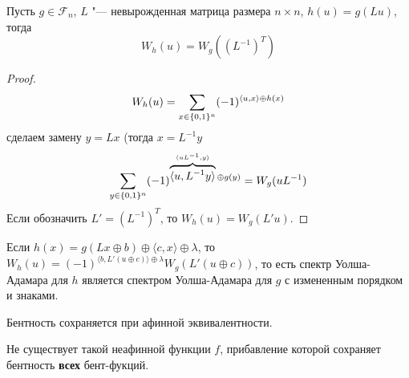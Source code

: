 \begin{remark}
Пусть $g \in \mathscr{F}_n$, $L$ "--- невырожденная матрица размера $n \times n$,
$h(u) = g(Lu)$, тогда $$W_h(u) = W_g((L^{-1})^{T})$$
\end{remark}

\begin{proof}
\[
W_h(u) = \sum\limits_{x \in \{0,1\}^n} (-1)^{\langle u,x \rangle \oplus h(x)}
\] 
сделаем замену $y = Lx$ (тогда $x = L^{-1} y$
\[
\sum\limits_{y \in \{0,1\}^n} (-1)^{\overbrace{\langle u, L^{-1} y \rangle}^
                                 {\langle u L^{-1}, y \rangle} \oplus g(y)} =
                                 W_g(u L^{-1})
\]
Если обозначить $L' = (L^{-1})^{T}$, то $W_h(u) = W_g(L'u)$.
\end{proof}

\begin{corollary}
Если $h(x) = g(Lx \oplus b) \oplus \langle c,x \rangle \oplus \lambda$,
то $W_h(u) = (-1)^{\langle b, L'(u \oplus c)\rangle \oplus \lambda} W_g(L'(u\oplus c))$,
то есть спектр Уолша-Адамара для $h$ является спектром Уолша-Адамара для
$g$ с измененным порядком и знаками.
\end{corollary}

\begin{corollary}
Бентность сохраняется при афинной эквивалентности.
\end{corollary}

\begin{theorem}
Не существует такой неафинной функции $f$, прибавление которой сохраняет
бентность {\bfseries всех} бент-фукций.
\end{theorem}
